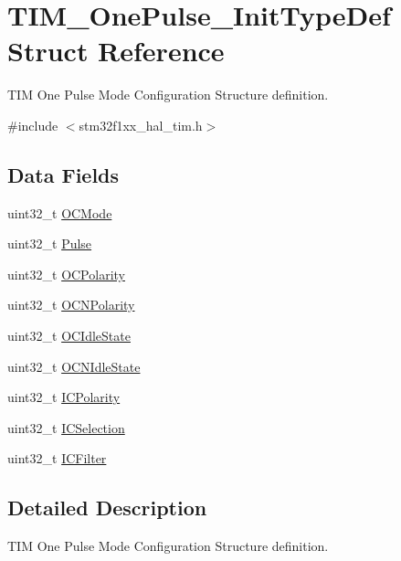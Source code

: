 \hypertarget{struct_t_i_m___one_pulse___init_type_def}{}\section{T\+I\+M\+\_\+\+One\+Pulse\+\_\+\+Init\+Type\+Def Struct Reference}
\label{struct_t_i_m___one_pulse___init_type_def}


T\+IM One Pulse Mode Configuration Structure definition.  




{\ttfamily \#include $<$stm32f1xx\+\_\+hal\+\_\+tim.\+h$>$}

\subsection*{Data Fields}
\begin{DoxyCompactItemize}
\item 
uint32\+\_\+t \hyperlink{struct_t_i_m___one_pulse___init_type_def_add4ac9143086c89effbede5c54e958bf}{O\+C\+Mode}
\item 
uint32\+\_\+t \hyperlink{struct_t_i_m___one_pulse___init_type_def_a5251c3bce4ca5baf013bc0ace0865a4c}{Pulse}
\item 
uint32\+\_\+t \hyperlink{struct_t_i_m___one_pulse___init_type_def_a781c7dae9dec8b6c974b1bdf591b77e7}{O\+C\+Polarity}
\item 
uint32\+\_\+t \hyperlink{struct_t_i_m___one_pulse___init_type_def_a978da9dd7cda80eb5fe8d04828b9bbcc}{O\+C\+N\+Polarity}
\item 
uint32\+\_\+t \hyperlink{struct_t_i_m___one_pulse___init_type_def_a57bb589da3cf2b39b727fe4a3d334ab3}{O\+C\+Idle\+State}
\item 
uint32\+\_\+t \hyperlink{struct_t_i_m___one_pulse___init_type_def_a78d21970d78c1e3e328692743406ba25}{O\+C\+N\+Idle\+State}
\item 
uint32\+\_\+t \hyperlink{struct_t_i_m___one_pulse___init_type_def_a6c0364c24e89f17849b0109236112fba}{I\+C\+Polarity}
\item 
uint32\+\_\+t \hyperlink{struct_t_i_m___one_pulse___init_type_def_a280cec08ad0ea4608ae57523775cc1c0}{I\+C\+Selection}
\item 
uint32\+\_\+t \hyperlink{struct_t_i_m___one_pulse___init_type_def_ab621c1517d5345834fcc71eea97156bf}{I\+C\+Filter}
\end{DoxyCompactItemize}


\subsection{Detailed Description}
T\+IM One Pulse Mode Configuration Structure definition. 

